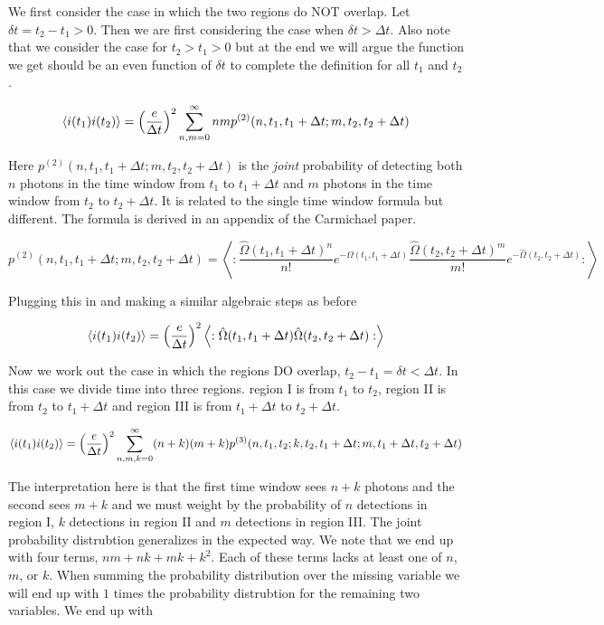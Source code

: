 \documentclass[12pt]{article}
\begin{document}
We first consider the case in which the two regions do NOT overlap. Let $\delta t = t_2-t_1>0$. Then we are first considering the case when $\delta t>\Delta t$. Also note that we consider the case for $t_2>t_1>0$ but at the end we will argue the function we get should be an even function of $\delta t$ to complete the definition for all $t_1$ and $t_2$.

\begin{equation}
\braket{i(t_1)i(t_2)} = \left(\frac{e}{\Delta t}\right)^2 \sum_{n,m = 0}^{\infty} n m p^{(2)}(n,t_1,t_1+\Delta t;m,t_2,t_2+\Delta t)
\end{equation}

Here $p^{(2)}(n,t_1,t_1+\Delta t;m,t_2,t_2+\Delta t)$ is the \textit{joint} probability of detecting both $n$ photons in the time window from $t_1$ to $t_1+\Delta t$ and $m$ photons in the time window from $t_2$ to $t_2+\Delta t$. It is related to the single time window formula but different. The formula is derived in an appendix of the Carmichael paper.

\begin{equation}
p^{(2)}(n,t_1,t_1+\Delta t;m,t_2,t_2+\Delta t) = \left<:\frac{\hat{\Omega}(t_1,t_1+\Delta t)^n}{n!} e^{-\hat{\Omega}(t_1,t_1+\Delta t)} \frac{\hat{\Omega}(t_2,t_2+\Delta t)^m}{m!} e^{-\hat{\Omega}(t_2,t_2+\Delta t)} :\right>
\end{equation}

Plugging this in and making a similar algebraic steps as before

\begin{equation}
\braket{i(t_1)i(t_2)} = \left(\frac{e}{\Delta t}\right)^2 \left<: \hat{\Omega}(t_1,t_1+\Delta t) \hat{\Omega}(t_2,t_2+\Delta t):\right>
\end{equation}

Now we work out the case in which the regions DO overlap, $t_2-t_1 = \delta t<\Delta t$. In this case we divide time into three regions. region I is from $t_1$ to $t_2$, region II is from $t_2$ to $t_1+\Delta t$ and region III is from $t_1+\Delta t$ to $t_2+\Delta t$.

\begin{equation}
\braket{i(t_1)i(t_2)} = \left(\frac{e}{\Delta t}\right)^2 \sum_{n,m,k=0}^{\infty} (n+k)(m+k) p^{(3)}(n,t_1, t_2;k,t_2, t_1+\Delta t;m,t_1+\Delta t, t_2+\Delta t)
\end{equation}

The interpretation here is that the first time window sees $n+k$ photons and the second sees $m+k$ and we must weight by the probability of $n$ detections in region I, $k$ detections in region II and $m$ detections in region III. The joint probability distrubtion generalizes in the expected way. We note that we end up with four terms, $nm+nk+mk+k^2$. Each of these terms lacks at least one of $n$, $m$, or $k$. When summing the probability distribution over the missing variable we will end up with $1$ times the probability distrubtion for the remaining two variables. We end up with
\end{document}
